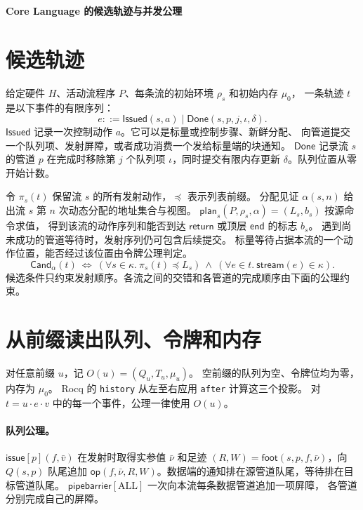 \documentclass[UTF8,a4paper,11pt,fontset=fandol]{ctexart}
\newcommand{\kw}[1]{\mathsf{#1}}
\begin{document}
\begin{center}\Large\bfseries Core Language 的候选轨迹与并发公理\end{center}

\section{候选轨迹}
给定硬件 \(H\)、活动流程序 \(P\)、每条流的初始环境 \(\rho_s\) 和初始内存 \(\mu_0\)，
一条轨迹 \(t\) 是以下事件的有限序列：
\[
 e ::= \kw{Issued}(s,a)\mid\kw{Done}(s,p,j,\iota,\delta).
\]
\(\kw{Issued}\) 记录一次控制动作 \(a\)。它可以是标量或控制步骤、新鲜分配、
向管道提交一个队列项、发射屏障，或者成功消费一个发给标量端的块通知。
\(\kw{Done}\) 记录流 \(s\) 的管道 \(p\) 在完成时移除第 \(j\) 个队列项
\(\iota\)，同时提交有限内存更新 \(\delta\)。队列位置从零开始计数。

令 \(\pi_s(t)\) 保留流 \(s\) 的所有发射动作，\(\preceq\) 表示列表前缀。
分配见证 \(\alpha(s,n)\) 给出流 \(s\) 第 \(n\) 次动态分配的地址集合与视图。
\(\mathsf{plan}_s(P,\rho_s,\alpha)=(L_s,b_s)\) 按源命令求值，
得到该流的动作序列和能否到达 \(\kw{return}\) 或顶层 \(\kw{end}\) 的标志 \(b_s\)。
遇到尚未成功的管道等待时，发射序列仍可包含后续提交。
标量等待占据本流的一个动作位置，能否经过该位置由令牌公理判定。
\[
 \mathsf{Cand}_{\alpha}(t)\ \iff\
 (\forall s\in\kappa.\ \pi_s(t)\preceq L_s)
 \ \land\ (\forall e\in t.\ \mathsf{stream}(e)\in\kappa).
\]
候选条件只约束发射顺序。各流之间的交错和各管道的完成顺序由下面的公理约束。

\section{从前缀读出队列、令牌和内存}
对任意前缀 \(u\)，记 \(O(u)=(Q_u,T_u,\mu_u)\)。
空前缀的队列为空、令牌位均为零，内存为 \(\mu_0\)。
Rocq 的 \texttt{history} 从左至右应用 \texttt{after} 计算这三个投影。
对 \(t=u\cdot e\cdot v\) 中的每一个事件，公理一律使用 \(O(u)\)。

\paragraph{队列公理。}
\(\kw{issue}[p](f,\bar v)\) 在发射时取得实参值 \(\bar\nu\) 和足迹
\((R,W)=\kw{foot}(s,p,f,\bar\nu)\)，向 \(Q(s,p)\) 队尾追加
\(\kw{op}(f,\bar\nu,R,W)\)。数据端的通知排在源管道队尾，等待排在目标管道队尾。
\(\kw{pipebarrier}[\mathrm{ALL}]\) 一次向本流每条数据管道追加一项屏障，
各管道分别完成自己的屏障。
\end{document}
